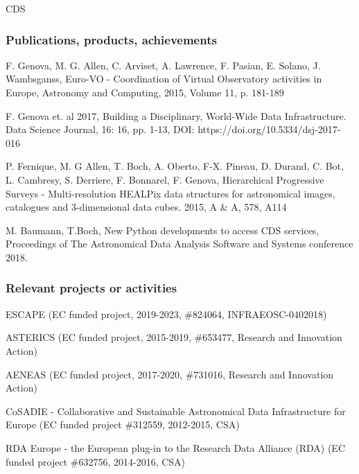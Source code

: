 \begin{sitedescription}{CDS}

\subsubsection*{Publications, products, achievements}

\begin{compactenum}
  \item F. Genova, M. G. Allen, C. Arviset, A. Lawrence, F. Pasian, E. Solano, J. Wambsganss, Euro-VO - Coordination of Virtual Observatory activities in Europe, Astronomy and Computing, 2015, Volume 11, p. 181-189
  \item F. Genova et. al 2017, Building a Disciplinary, World-Wide Data Infrastructure. Data Science Journal, 16: 16, pp. 1-13, DOI: https://doi.org/10.5334/dsj-2017-016
  \item P. Fernique, M. G Allen, T. Boch, A. Oberto, F-X. Pineau, D. Durand, C. Bot, L. Cambresy, S. Derriere, F. Bonnarel, F. Genova, Hierarchical Progressive Surveys - Multi-resolution HEALPix data structures for astronomical images, catalogues and 3-dimensional data cubes.  2015, A \& A, 578, A114 
  \item M. Baumann, T.Boch, New Python developments to access CDS services, Proceedings of The Astronomical Data Analysis Software and Systems conference 2018.
\end{compactenum}

\subsubsection*{Relevant projects or activities}

\begin{compactenum}
  \item ESCAPE (EC funded project, 2019-2023, \#824064, INFRAEOSC-0402018)
  \item ASTERICS (EC funded project, 2015-2019, \#653477, Research and Innovation Action)
  \item AENEAS (EC funded project,  2017-2020, \#731016, Research and Innovation Action)
  \item CoSADIE - Collaborative and Sustainable Astronomical Data Infrastructure for Europe (EC funded project \#312559, 2012-2015, CSA)
  \item RDA Europe - the European plug-in to the Research Data Alliance (RDA) (EC funded project \#632756, 2014-2016, CSA)
\end{compactenum}


\end{sitedescription}

